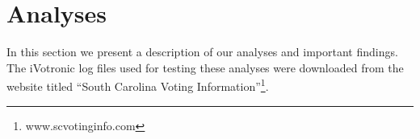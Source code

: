 \section{Analyses}
In this section we present a description of our analyses and important findings.  The iVotronic log files used for testing these analyses were downloaded from the website titled ``South Carolina Voting Information''\footnote{www.scvotinginfo.com}.







